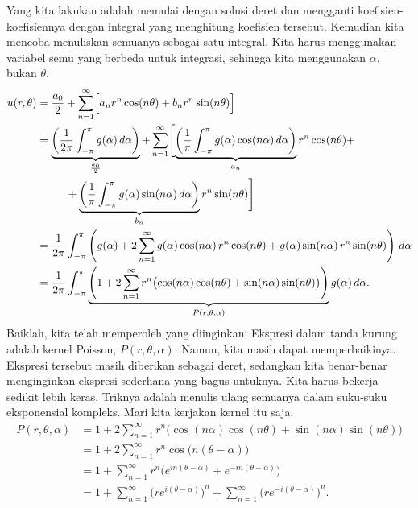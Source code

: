 Yang kita lakukan adalah memulai dengan solusi deret dan mengganti koefisien-koefisiennya
dengan integral yang menghitung koefisien tersebut.  Kemudian kita mencoba menuliskan semuanya sebagai
satu integral.  Kita harus menggunakan variabel semu yang berbeda untuk
integrasi, sehingga kita menggunakan $\alpha$, bukan $\theta$.
\begin{equation*}
\begin{split}
u(r,\theta)
& =
\frac{a_0}{2} +
\sum_{n=1}^\infty
\Bigl[
a_n r^n \cos(n \theta) + b_n r^n \sin(n \theta)
\Bigr]
\\
& =
\underbrace{
 \left(
  \frac{1}{2\pi} \int_{-\pi}^\pi g(\alpha) \, d\alpha
 \right)
}_{\frac{a_0}{2}}
+
\sum_{n=1}^\infty
\Biggl[
\underbrace{
 \left(
  \frac{1}{\pi} \int_{-\pi}^\pi g(\alpha) \cos (n\alpha) \, d\alpha
 \right)
}_{a_n}
r^n \cos(n \theta) +
\\
& ~~~~~~~~ +
\underbrace{
 \left(
  \frac{1}{\pi} \int_{-\pi}^\pi g(\alpha) \sin (n\alpha) \, d\alpha
 \right)
}_{b_n}
r^n \sin(n \theta)
\Biggr]
\\
& =
\frac{1}{2\pi}
\int_{-\pi}^\pi
\left(  g(\alpha)
+
2
\sum_{n=1}^\infty
g(\alpha) \cos (n\alpha) 
\, r^n \cos(n \theta) +
g(\alpha) \sin (n\alpha)
\, r^n \sin(n \theta)
\right) \,d\alpha
\\
& =
\frac{1}{2\pi}
\int_{-\pi}^\pi
\underbrace{
 \left( 1
 +
 2
 \sum_{n=1}^\infty
 r^n 
 \bigl(
 \cos (n\alpha) 
 \cos(n \theta) +
 \sin (n\alpha)
 \sin(n \theta) \bigr)
 \right)
}_{P(r,\theta,\alpha)}
g(\alpha) \,d\alpha .
\end{split}
\end{equation*}
Baiklah, kita telah memperoleh yang diinginkan: Ekspresi dalam tanda kurung adalah
kernel Poisson, $P(r,\theta,\alpha)$.  Namun, kita masih dapat memperbaikinya.  Ekspresi tersebut masih diberikan sebagai
deret, sedangkan kita benar-benar menginginkan ekspresi sederhana yang bagus untuknya. 
Kita harus bekerja sedikit lebih keras.  Triknya adalah menulis ulang semuanya dalam suku-suku
eksponensial kompleks.  Mari kita kerjakan
kernel itu saja.
\begin{equation*}
\begin{split}
P(r,\theta,\alpha)
& =
1
+
2
\sum_{n=1}^\infty
r^n 
\bigl(
\cos (n\alpha) 
\cos(n \theta) +
\sin (n\alpha)
\sin(n \theta) \bigr)
\\
& =
1
+
2
\sum_{n=1}^\infty
r^n 
\cos \bigl(n(\theta-\alpha)\bigr)
\\
& =
1
+
\sum_{n=1}^\infty
r^n 
\bigl(
e^{in(\theta-\alpha)} +
e^{-in(\theta-\alpha)} \bigr)
\\
& =
1
+
\sum_{n=1}^\infty
{\bigl(
re^{i(\theta-\alpha)}\bigr)}^{n}
+
\sum_{n=1}^\infty
{\bigl(
re^{-i(\theta-\alpha)}\bigr)}^{n} .
\end{split}
\end{equation*}
